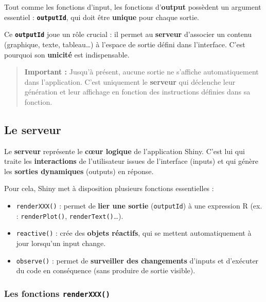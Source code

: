 \documentclass[
]{article}
\providecommand{\tightlist}{%
  \setlength{\itemsep}{0pt}\setlength{\parskip}{0pt}}
\begin{document}
Tout comme les fonctions d'input, les fonctions d'\textbf{output}
possèdent un argument essentiel : \textbf{\texttt{outputId}}, qui doit
être \textbf{unique} pour chaque sortie.

Ce \textbf{\texttt{outputId}} joue un rôle crucial : il permet au
\textbf{serveur} d'associer un contenu (graphique, texte, tableau\ldots)
à l'espace de sortie défini dans l'interface. C'est pourquoi son
\textbf{unicité} est indispensable.

\begin{quote}
\textbf{Important :} Jusqu'à présent, aucune sortie ne s'affiche
automatiquement dans l'application. C'est uniquement le \textbf{serveur}
qui déclenche leur génération et leur affichage en fonction des
instructions définies dans sa fonction.
\end{quote}

\subsection{Le serveur}\label{le-serveur}

Le \textbf{serveur} représente le \textbf{cœur logique} de l'application
Shiny. C'est lui qui traite les \textbf{interactions} de l'utilisateur
issues de l'interface (inputs) et qui génère les \textbf{sorties
dynamiques} (outputs) en réponse.

Pour cela, Shiny met à disposition plusieurs fonctions essentielles :

\begin{itemize}
\tightlist
\item
  \texttt{renderXXX()} : permet de \textbf{lier une sortie}
  (\texttt{outputId}) à une expression R (ex. : \texttt{renderPlot()},
  \texttt{renderText()}\ldots).\\
\item
  \texttt{reactive()} : crée des \textbf{objets réactifs}, qui se
  mettent automatiquement à jour lorsqu'un input change.\\
\item
  \texttt{observe()} : permet de \textbf{surveiller des changements}
  d'inputs et d'exécuter du code en conséquence (sans produire de sortie
  visible).
\end{itemize}

\subsubsection{\texorpdfstring{Les fonctions
\texttt{renderXXX()}}{Les fonctions renderXXX()}}\label{les-fonctions-renderxxx}
\end{document}
